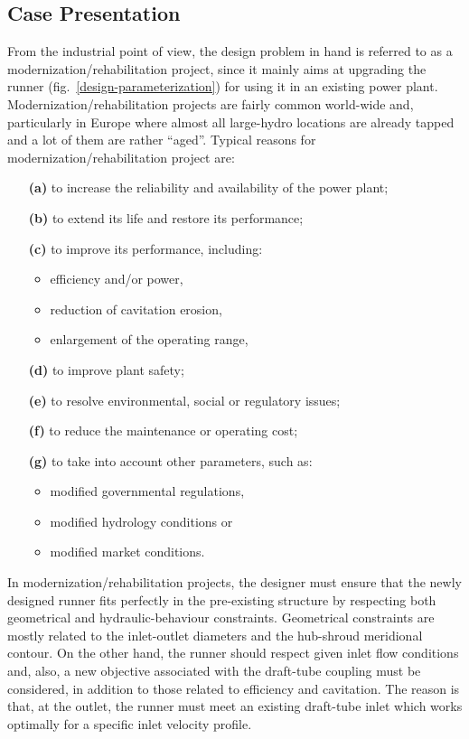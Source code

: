\subsection{Case Presentation}
From the industrial point of view, the design problem in hand is referred to as a modernization/rehabilitation project, since it mainly aims at upgrading the runner (fig.\  \ref{design-parameterization}) for using it in an existing power plant. Modernization/rehabilitation projects are fairly common world-wide and, particularly in Europe where almost all large-hydro locations are already tapped and a lot of them are rather ``aged''. Typical reasons for modernization/rehabilitation project are:
\begin{itemize}
\item[\textbf{(a)}] to increase the reliability and availability of the power plant; 
\item[\textbf{(b)}] to extend its life and restore its performance; 
\item[\textbf{(c)}] to improve its performance, including:
\begin{itemize}
	\item efficiency and/or power,
    \item reduction of cavitation erosion,
	\item enlargement of the operating range,
\end{itemize}
\item[\textbf{(d)}] to improve plant safety;
\item[\textbf{(e)}] to resolve environmental, social or regulatory issues;
\item[\textbf{(f)}] to reduce the maintenance or operating cost;
\item[\textbf{(g)}] to take into account other parameters, such as:
\begin{itemize}
	\item modified governmental regulations,
	\item modified hydrology conditions or
	\item modified market conditions.
\end{itemize}
\end{itemize}

In modernization/rehabilitation projects, the designer must ensure that the newly designed runner fits perfectly in the pre-existing structure by respecting both geometrical and hydraulic-behaviour constraints. Geometrical constraints are mostly related to the inlet-outlet diameters and the hub-shroud meridional contour. On the other hand, the runner should respect given inlet flow conditions and, also, a new objective associated with the draft-tube coupling must be considered, in addition to those related to efficiency and cavitation. The reason is that, at the outlet, the runner must meet an existing draft-tube inlet which works optimally for a specific inlet velocity profile.      
  
